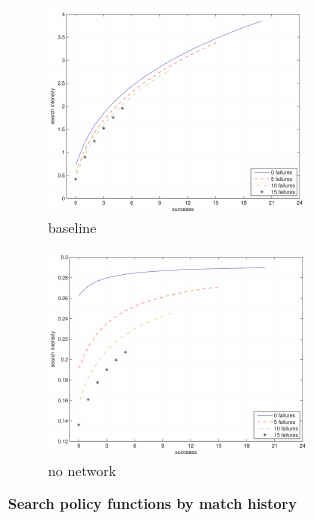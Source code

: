 \documentclass[12pt,titlepage]{article}
\begin{document}
\begin{figure}[tbp]
\centering%
\begin{subfigure}[b]{0.7\textwidth}
        \includegraphics[width=\textwidth]{figures/figure2a.pdf}
        \caption{baseline}
        \label{fig:baseline_search_policy}
    \end{subfigure}
\par
\begin{subfigure}[b]{0.7\textwidth}
        \includegraphics[width=\textwidth]{figures/figure2b.pdf}
        \caption{no network}
        \label{fig:no_network_search_policy}
    \end{subfigure}
\caption{\textbf{Search policy functions by match history}}
\label{fig:search_policy_outer}
\end{figure}
\end{document}
